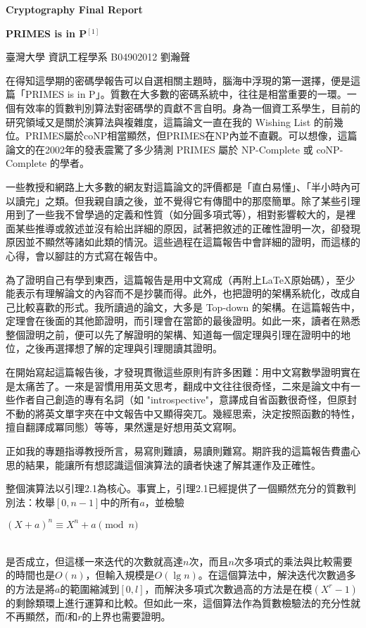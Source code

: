 \documentclass{article}
\begin{document}
\fontsize{12pt}{20pt}\selectfont
\centerline{ \bfseries\huge{Cryptography Final Report}}

\centerline{ \bfseries\huge{PRIMES is in P}$^{[1]}$}
\begin{flushright}
    臺灣大學 資訊工程學系 B04902012 劉瀚聲
\end{flushright}



\indent    在得知這學期的密碼學報告可以自選相關主題時，腦海中浮現的第一選擇，便是這篇「PRIMES is in P」。質數在大多數的密碼系統中，往往是相當重要的一環。一個有效率的質數判別算法對密碼學的貢獻不言自明。身為一個資工系學生，目前的研究領域又是關於演算法與複雜度，這篇論文一直在我的 Wishing List 的前幾位。PRIMES屬於coNP相當顯然，但PRIMES在NP內並不直觀。可以想像，這篇論文的在2002年的發表震驚了多少猜測 PRIMES 屬於 NP-Complete 或 coNP-Complete 的學者。

    一些教授和網路上大多數的網友對這篇論文的評價都是「直白易懂」、「半小時內可以讀完」之類。但我親自讀之後，並不覺得它有傳聞中的那麼簡單。除了某些引理用到了一些我不曾學過的定義和性質（如分圓多項式等），相對影響較大的，是裡面某些推導或敘述並沒有給出詳細的原因，試著把敘述的正確性證明一次，卻發現原因並不顯然等諸如此類的情況。這些過程在這篇報告中會詳細的證明，而這樣的心得，會以腳註的方式寫在報告中。

    為了證明自己有學到東西，這篇報告是用中文寫成（再附上\LaTeX 原始碼），至少能表示有理解論文的內容而不是抄襲而得。此外，也把證明的架構系統化，改成自己比較喜歡的形式。我所讀過的論文，大多是 Top-down 的架構。在這篇報告中，定理會在後面的其他節證明，而引理會在當節的最後證明。如此一來，讀者在熟悉整個證明之前，便可以先了解證明的架構、知道每一個定理與引理在證明中的地位，之後再選擇想了解的定理與引理閱讀其證明。

    在開始寫起這篇報告後，才發現貫徹這些原則有許多困難：用中文寫數學證明實在是太痛苦了。一來是習慣用用英文思考，翻成中文往往很奇怪，二來是論文中有一些作者自己創造的專有名詞（如 "introspective"，意譯成自省函數很奇怪，但原封不動的將英文單字夾在中文報告中又顯得突兀。幾經思索，決定按照函數的特性，擅自翻譯成冪同態）等等，果然還是好想用英文寫啊。

    正如我的專題指導教授所言，易寫則難讀，易讀則難寫。期許我的這篇報告費盡心思的結果，能讓所有想認識這個演算法的讀者快速了解其運作及正確性。

    整個演算法以引理2.1為核心。事實上，引理2.1已經提供了一個顯然充分的質數判別法：枚舉$[0,n-1]$中的所有$a$，並檢驗\\
    \centerline{$(X+a)^n\equiv X^n+a \pmod{n}$}\\
    是否成立，但這樣一來迭代的次數就高達$n$次，而且$n$次多項式的乘法與比較需要的時間也是$O(n)$，但輸入規模是$O(\lg n)$。在這個算法中，解決迭代次數過多的方法是將$a$的範圍縮減到$[0,l]$，而解決多項式次數過高的方法是在模$(X^r-1)$的剩餘類環上進行運算和比較。但如此一來，這個算法作為質數檢驗法的充分性就不再顯然，而$l$和$r$的上界也需要證明。
\end{document}
